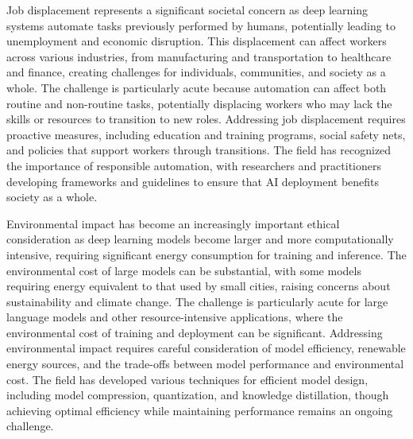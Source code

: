Job displacement represents a significant societal concern as deep learning systems automate tasks previously performed by humans, potentially leading to unemployment and economic disruption. This displacement can affect workers across various industries, from manufacturing and transportation to healthcare and finance, creating challenges for individuals, communities, and society as a whole. The challenge is particularly acute because automation can affect both routine and non-routine tasks, potentially displacing workers who may lack the skills or resources to transition to new roles. Addressing job displacement requires proactive measures, including education and training programs, social safety nets, and policies that support workers through transitions. The field has recognized the importance of responsible automation, with researchers and practitioners developing frameworks and guidelines to ensure that AI deployment benefits society as a whole.

Environmental impact has become an increasingly important ethical consideration as deep learning models become larger and more computationally intensive, requiring significant energy consumption for training and inference. The environmental cost of large models can be substantial, with some models requiring energy equivalent to that used by small cities, raising concerns about sustainability and climate change. The challenge is particularly acute for large language models and other resource-intensive applications, where the environmental cost of training and deployment can be significant. Addressing environmental impact requires careful consideration of model efficiency, renewable energy sources, and the trade-offs between model performance and environmental cost. The field has developed various techniques for efficient model design, including model compression, quantization, and knowledge distillation, though achieving optimal efficiency while maintaining performance remains an ongoing challenge.


